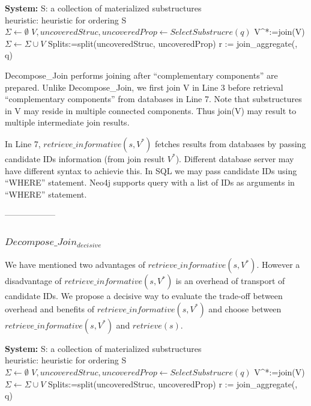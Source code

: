 \begin{algorithm}[H]
	\caption{$Decompose\_Join_{informative}$}
	\LinesNumbered
	\textbf{System:} S: a collection of materialized substructures\\ heuristic: heuristic for ordering S\\
	$\Sigma \gets \emptyset $\;
	$V, uncoveredStruc, uncoveredProp \gets SelectSubstrucre(q) $\;
	V^{*}:=join(V)\;
	$\Sigma \gets \Sigma \cup V $\;
	Splits:=split(uncoveredStruc, uncoveredProp)\;
	r := join\_aggregate(\Sigma, q)\;
\end{algorithm}
\clearpage

Decompose\_Join performs joining after ``complementary components'' are prepared. Unlike Decompose\_Join, we first join V in Line 3 before retrieval ``complementary components'' from databases in Line 7. Note that substructures in V may reside in multiple connected components. Thus join(V) may result to multiple intermediate join results.

In Line 7, $retrieve\_{informative}(s, V^{*})$ fetches results from databases by passing candidate IDs information (from join result $V^{*}$). Different database server may have different syntax to achievie this. In SQL we may pass candidate IDs using ``WHERE'' statement. Neo4j  supports query with a list of IDs as arguments in ``WHERE'' statement.

------------------
\subsubsection{$Decompose\_Join_{decisive}$}
We have mentioned two advantages of $retrieve\_{informative}(s, V^{*})$. However a disadvantage of $retrieve\_{informative}(s, V^{*})$ is an overhead of transport of candidate IDs. We propose a decisive way to evaluate the trade-off between overhead and benefits of $retrieve\_{informative}(s, V^{*})$ and choose between $retrieve\_{informative}(s, V^{*})$ and $retrieve(s)$.

\begin{algorithm}[H]
	\caption{$Decompose\_Join_{decisive}$}
	\LinesNumbered
	\textbf{System:} S: a collection of materialized substructures\\ heuristic: heuristic for ordering S\\
	$\Sigma \gets \emptyset $\;
	$V, uncoveredStruc, uncoveredProp \gets SelectSubstrucre(q) $\;
	V^{*}:=join(V)\;
	$\Sigma \gets \Sigma \cup V $\;
	Splits:=split(uncoveredStruc, uncoveredProp)\;
	r := join\_aggregate(\Sigma, q)\;
\end{algorithm}
\clearpage

